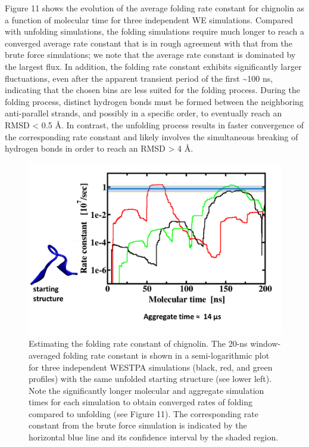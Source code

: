 \documentclass[9pt,tutorial,ASAPversion]{livecoms}
\begin{document}
Figure 11 shows the evolution of the average folding rate constant for chignolin as a function of molecular time for three independent WE simulations. 
Compared with unfolding simulations, the folding simulations require much longer to reach a converged average rate constant that is in rough agreement with that from the brute force simulations; we note that the average rate constant is dominated by the largest flux. 
In addition, the folding rate constant exhibits significantly larger fluctuations, even after the apparent transient period of the first \textasciitilde 100 ns, indicating that the chosen bins are less suited for the folding process. 
During the folding process, distinct hydrogen bonds must be formed between the neighboring anti-parallel strands, and possibly in a specific order, to eventually reach an RMSD < 0.5 \AA. 
In contrast, the unfolding process results in faster convergence of the corresponding rate constant and likely involves the simultaneous breaking of hydrogen bonds in order to reach an RMSD > 4 \AA.

\begin{figure}
\includegraphics[width=\linewidth]{Figure11.png}
\caption{Estimating the folding rate constant of chignolin. 
The 20-ns window-averaged folding rate constant is shown in a semi-logarithmic plot for three independent WESTPA simulations (black, red, and green profiles) with the same unfolded starting structure (see lower left). 
Note the significantly longer molecular and aggregate simulation times for each simulation to obtain converged rates of folding compared to unfolding (see Figure 11). 
The corresponding rate constant from the brute force simulation is indicated by the horizontal blue line and its confidence interval by the shaded region.}
\label{fig:view}
\end{figure}
\end{document}
